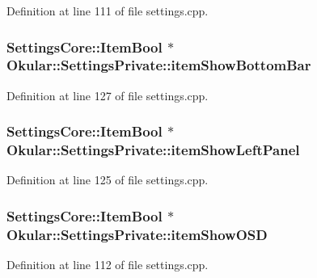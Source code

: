 Definition at line 111 of file settings.\+cpp.

\hypertarget{classOkular_1_1SettingsPrivate_a0808b4fe0b5d77a1a1b1df04b8883aae}{
\subsubsection[{item\+Show\+Bottom\+Bar}]{\setlength{\rightskip}{0pt plus 5cm}Settings\+Core\+::\+Item\+Bool $\ast$ Okular\+::\+Settings\+Private\+::item\+Show\+Bottom\+Bar}}\label{classOkular_1_1SettingsPrivate_a0808b4fe0b5d77a1a1b1df04b8883aae}


Definition at line 127 of file settings.\+cpp.

\hypertarget{classOkular_1_1SettingsPrivate_ae2114c36e09aec98410ed23e0269ff98}{
\subsubsection[{item\+Show\+Left\+Panel}]{\setlength{\rightskip}{0pt plus 5cm}Settings\+Core\+::\+Item\+Bool $\ast$ Okular\+::\+Settings\+Private\+::item\+Show\+Left\+Panel}}\label{classOkular_1_1SettingsPrivate_ae2114c36e09aec98410ed23e0269ff98}


Definition at line 125 of file settings.\+cpp.

\hypertarget{classOkular_1_1SettingsPrivate_a27f1970c3866f47ce57e6652f0ac0a44}{
\subsubsection[{item\+Show\+O\+S\+D}]{\setlength{\rightskip}{0pt plus 5cm}Settings\+Core\+::\+Item\+Bool $\ast$ Okular\+::\+Settings\+Private\+::item\+Show\+O\+S\+D}}\label{classOkular_1_1SettingsPrivate_a27f1970c3866f47ce57e6652f0ac0a44}


Definition at line 112 of file settings.\+cpp.

